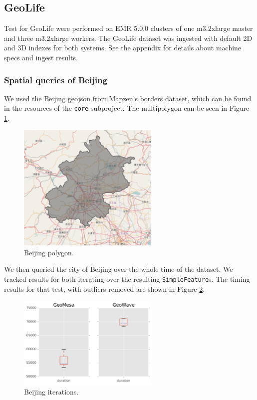 \subsection{ GeoLife}

Test for GeoLife were performed on EMR 5.0.0 clusters of one m3.2xlarge master and three m3.2xlarge workers.
The GeoLife dataset was ingested with default 2D and 3D indexes for both systems.
See the appendix for details about machine specs and ingest results.

\subsubsection{Spatial queries of Beijing}

We used the Beijing geojson from Mapzen's borders dataset, which can be found in the resources of the \texttt{core} subproject.
The multipolygon can be seen in Figure \ref{beijingpolygon}.

\begin{figure}[h!tb]
  \centering
  \includegraphics[width=0.60\textwidth]{../docs/img/beijing-poly.png}
  \caption{Beijing polygon.}
  \label{beijingpolygon}
\end{figure}

We then queried the city of Beijing over the whole time of the dataset.
We tracked results for both iterating over the resulting \texttt{SimpleFeature}s.
The timing results for that test, with outliers removed are shown in Figure \ref{beijingiterate}.

\begin{figure}[h!tb]
  \centering
  \includegraphics[width=0.60\textwidth]{../docs/img/geolife-beijing-iterate.png}
  \caption{Beijing iterations.}
  \label{beijingiterate}
\end{figure}


